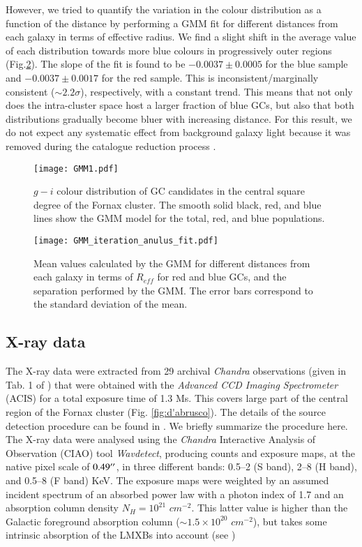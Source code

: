\documentclass{aa}
\begin{document}
However, we tried to quantify the variation in the colour distribution as a function of the distance by performing a GMM fit for different distances from each galaxy in terms of effective radius. We find a slight shift in the average value of each distribution towards more blue colours in progressively outer regions (Fig.\ref{fig:GMMdifference}). The slope of the fit is found to be $-0.0037 \pm 0.0005$ for the blue sample and $-0.0037 \pm 0.0017$ for the red sample. This is inconsistent/marginally consistent ($\sim 2.2\sigma$), respectively, with a constant trend. 
This means that not only does the intra-cluster space host a larger fraction of blue GCs, but also that both distributions gradually become bluer with increasing distance. For this result, we do not expect any systematic effect from background galaxy light because it was removed during the catalogue reduction process \citep{Cantiello2020}.


\begin{figure}
    \centering
    \texttt{[image: GMM1.pdf]}
    \caption{$g-i$ colour distribution of GC candidates in the central square degree of the Fornax cluster. The smooth solid  black, red, and blue lines show the GMM model for the total, red, and blue populations.}
    \label{fig:GMM}
\end{figure}

\begin{figure}
    \centering
    \texttt{[image: GMM\_iteration\_anulus\_fit.pdf]}
    \caption{Mean values calculated by the GMM for different distances from each galaxy in terms of $R_{eff}$ for red and blue GCs, and the separation performed by the GMM. The error bars correspond to the standard deviation of the mean.}
    \label{fig:GMMdifference}
\end{figure}



\subsection{X-ray data}
\label{Xray_data}
\label{sec:2.2}
 The X-ray data were extracted from 29 archival \textit{Chandra} observations (given in Tab. 1 of \citealt{Jin2019}) that were obtained with the \textit{Advanced CCD Imaging Spectrometer} (ACIS) for a total exposure time of 1.3 Ms. This covers large part of the central region of the Fornax cluster (Fig. \ref{fig:d'abrusco}). The details of the source detection procedure can be found in \cite{Jin2019}. We briefly summarize the procedure here. The X-ray data were analysed using the \textit{Chandra} Interactive Analysis of Observation (CIAO) tool \textit{Wavdetect}, producing counts and exposure maps, at the native pixel scale of $0.49^{\prime\prime}$, in three different bands: 0.5–2 (S band), 2–8 (H band), and 0.5–8 (F band) KeV. The exposure maps were weighted by an assumed incident spectrum of an absorbed power law with a photon index of 1.7 and an absorption column density $N_H=10^{21}$ $cm^{-2}$. This latter value is higher than the Galactic foreground absorption column ($\sim 1.5 \times 10^{20}$ $cm^{-2}$), but takes some intrinsic absorption of the LMXBs into account (see \citealt{Jin2019})
\end{document}
